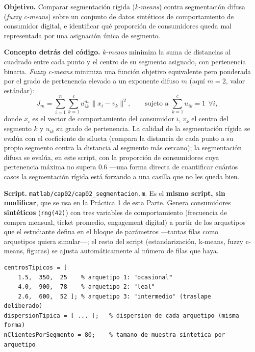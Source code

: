 \begin{cajaLaboratorio}
\textbf{Objetivo.} Comparar segmentación rígida (\textit{k-means}) contra
segmentación difusa (\textit{fuzzy c-means}) sobre un conjunto de datos
sintéticos de comportamiento de consumidor digital, e identificar qué
proporción de consumidores queda mal representada por una asignación única
de segmento.

\textbf{Concepto detrás del código.} \textit{k-means} minimiza la suma de
distancias al cuadrado entre cada punto y el centro de su segmento asignado,
con pertenencia binaria. \textit{Fuzzy c-means} minimiza una función
objetivo equivalente pero ponderada por el grado de pertenencia elevado a un
exponente difuso $m$ (aquí $m=2$, valor estándar):
\[
  J_m = \sum_{i=1}^{n}\sum_{k=1}^{c} u_{ik}^{m}\, \lVert x_i - v_k \rVert^2,
  \qquad \text{sujeto a } \sum_{k=1}^{c} u_{ik} = 1 \ \ \forall i,
\]
donde $x_i$ es el vector de comportamiento del consumidor $i$, $v_k$ el
centro del segmento $k$ y $u_{ik}$ su grado de pertenencia. La calidad de la
segmentación rígida se evalúa con el coeficiente de silueta (compara la
distancia de cada punto a su propio segmento contra la distancia al segmento
más cercano); la segmentación difusa se evalúa, en este script, con la
proporción de consumidores cuya pertenencia máxima no supera 0.6 —una forma
directa de cuantificar cuántos casos la segmentación rígida está forzando a
una casilla que no les queda bien.

\textbf{Script.} \texttt{matlab/cap02/cap02\_segmentacion.m}. Es el
\textbf{mismo script, sin modificar}, que se usa en la Práctica 1 de esta
Parte. Genera consumidores \textbf{sintéticos} (\texttt{rng(42)}) con tres
variables de comportamiento (frecuencia de compra mensual, ticket promedio,
engagement digital) a partir de los arquetipos que el estudiante defina en
el bloque de parámetros —tantas filas como arquetipos quiera simular—; el
resto del script (estandarización, k-means, fuzzy c-means, figuras) se
ajusta automáticamente al número de filas que haya.

\begin{lstlisting}[style=MATLABStyle, caption={Bloque de parámetros editable (\texttt{cap02\_segmentacion.m}) — cada fila es un arquetipo.}]
centrosTipicos = [
    1.5,  350,  25    % arquetipo 1: "ocasional"
    4.0,  900,  78    % arquetipo 2: "leal"
    2.6,  600,  52 ]; % arquetipo 3: "intermedio" (traslape deliberado)
dispersionTipica = [ ... ];   % dispersion de cada arquetipo (misma forma)
nClientesPorSegmento = 80;    % tamano de muestra sintetica por arquetipo
\end{lstlisting}


\end{cajaLaboratorio}
